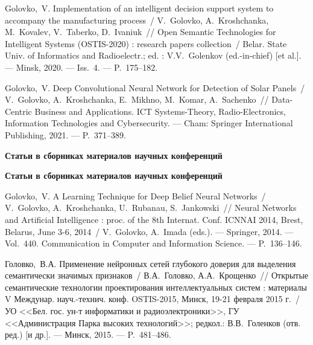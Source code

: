 Golovko,~V. Implementation of an intelligent decision support system to accompany the manufacturing process~/ V.~Golovko, A.~Kroshchanka, M.~Kovalev, V.~Taberko, D.~Ivaniuk~// 
\newblock Open Semantic Technologies for Intelligent Systems (OSTIS-2020) : research papers collection~/
\newblock Belar. State Univ. of Informatics and Radioelectr.; ed. : V.V.~Golenkov (ed.-in-chief) [et al.]. ---
\newblock Minsk, 2020. ---
\newblock Iss.~4. ---
\newblock P.~175--182.

Golovko,~V. Deep Convolutional Neural Network for Detection of Solar Panels~/ V.~Golovko, A.~Kroshchanka, E.~Mikhno, M.~Komar, A.~Sachenko~//
\newblock Data-Centric Business and Applications. ICT Systems-Theory, Radio-Electronics, Information Technologies and Cybersecurity. ---
\newblock Cham: Springer International Publishing, 2021. ---
\newblock P.~371--389.

\ifx\isabstract\undefined 
\begin{center}
\vspace{3mm}
{\bf Статьи в сборниках материалов научных конференций}
\vspace{3mm}
\end{center}
\else
\vspace{2mm}
{\bf Статьи в сборниках материалов научных конференций}
\vspace{2mm}
\fi

Golovko,~V. A Learning Technique for Deep Belief Neural Networks~/ V.~Golovko, A.~Kroshchanka, U.~Rubanau, S.~Jankowski~//
\newblock Neural Networks and Artificial Intelligence : proc. of the 8th Internat. Conf. ICNNAI 2014, Brest, Belarus, June 3-6, 2014~/
\newblock V.~Golovko, A.~Imada (eds.). ---
\newblock Springer, 2014. ---
\newblock Vol.~440. Communication in Computer and Information Science. ---
\newblock P.~136--146.

Головко,~В.А. Применение нейронных сетей глубокого доверия для выделения семантически значимых признаков~/ В.А.~Головко, А.А.~Крощенко~// 
\newblock Открытые семантические технологии проектирования интеллектуальных систем : материалы V Междунар. науч.-технич. конф. OSTIS-2015, Минск, 19-21 февраля 2015 г.~/
\newblock УО <<Бел. гос. ун-т информатики и радиоэлектроники>>, ГУ <<Администрация Парка высоких технологий>>; редкол.: В.В.~Голенков (отв. ред.) [и др.]. ---
\newblock Минск, 2015. ---
\newblock P.~481--486.

